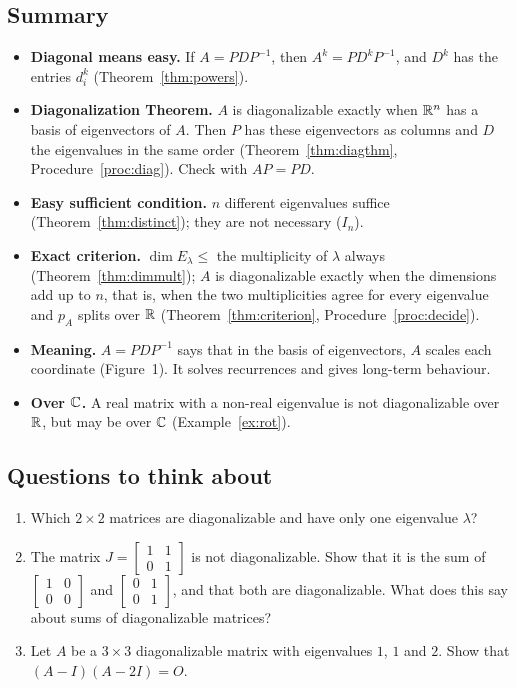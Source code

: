 \documentclass[11pt]{article}
\begin{document}
\subsection*{Summary}
\begin{itemize}
  \item \textbf{Diagonal means easy.} If $A=PDP^{-1}$, then $A^k=PD^kP^{-1}$, and $D^k$ has the entries $d_i^k$ (Theorem~\ref{thm:powers}).
  \item \textbf{Diagonalization Theorem.} $A$ is diagonalizable exactly when $\mathbb{R}^n$ has a basis of eigenvectors of $A$. Then $P$ has these eigenvectors as columns and $D$ the eigenvalues in the same order (Theorem~\ref{thm:diagthm}, Procedure~\ref{proc:diag}). Check with $AP=PD$.
  \item \textbf{Easy sufficient condition.} $n$ different eigenvalues suffice (Theorem~\ref{thm:distinct}); they are not necessary ($I_n$).
  \item \textbf{Exact criterion.} $\dim E_\lambda\le$ the multiplicity of $\lambda$ always (Theorem~\ref{thm:dimmult}); $A$ is diagonalizable exactly when the dimensions add up to $n$, that is, when the two multiplicities agree for every eigenvalue and $p_A$ splits over $\mathbb{R}$ (Theorem~\ref{thm:criterion}, Procedure~\ref{proc:decide}).
  \item \textbf{Meaning.} $A=PDP^{-1}$ says that in the basis of eigenvectors, $A$ scales each coordinate (Figure~1). It solves recurrences and gives long-term behaviour.
  \item \textbf{Over $\mathbb{C}$.} A real matrix with a non-real eigenvalue is not diagonalizable over $\mathbb{R}$, but may be over $\mathbb{C}$ (Example~\ref{ex:rot}).
\end{itemize}

\subsection*{Questions to think about}
\begin{enumerate}
  \item Which $2\times2$ matrices are diagonalizable and have only one eigenvalue $\lambda$?
  \item The matrix $J=\begin{bmatrix}1&1\\0&1\end{bmatrix}$ is not diagonalizable. Show that it is the sum of $\begin{bmatrix}1&0\\0&0\end{bmatrix}$ and $\begin{bmatrix}0&1\\0&1\end{bmatrix}$, and that both are diagonalizable. What does this say about sums of diagonalizable matrices?
  \item Let $A$ be a $3\times3$ diagonalizable matrix with eigenvalues $1$, $1$ and $2$. Show that $(A-I)(A-2I)=O$.
\end{enumerate}
\end{document}
